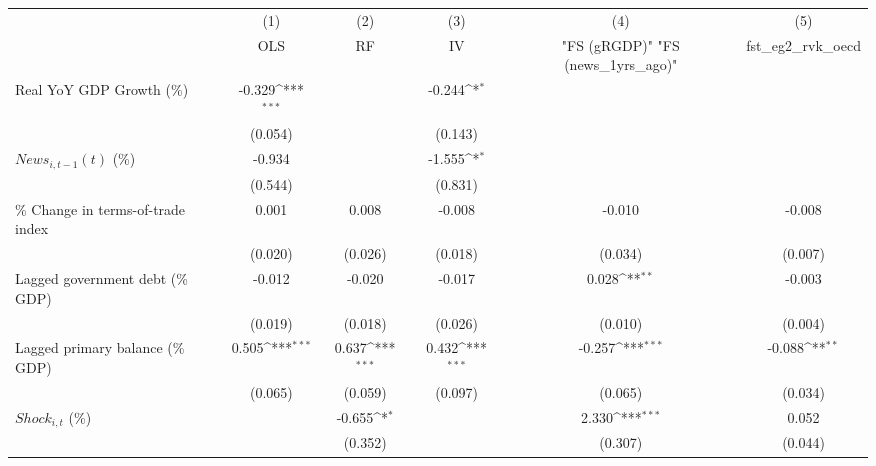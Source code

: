 {
\def\sym#1{\ifmmode^{#1}\else\(^{#1}\)\fi}
\begin{tabular}{l*{5}{c}}
\toprule
                    &\multicolumn{1}{c}{(1)}&\multicolumn{1}{c}{(2)}&\multicolumn{1}{c}{(3)}&\multicolumn{1}{c}{(4)}&\multicolumn{1}{c}{(5)}\\
                    &\multicolumn{1}{c}{OLS}&\multicolumn{1}{c}{RF}&\multicolumn{1}{c}{IV}&\multicolumn{1}{c}{ "FS (gRGDP)"  "FS (news_1yrs_ago)" }&\multicolumn{1}{c}{fst_eg2_rvk_oecd}\\
\midrule
Real YoY GDP Growth (\%)&      -0.329\sym{***}&                     &      -0.244\sym{*}  &                     &                     \\
                    &     (0.054)         &                     &     (0.143)         &                     &                     \\
\addlinespace
$ News_{i,t-1}(t)$ (\%)&      -0.934         &                     &      -1.555\sym{*}  &                     &                     \\
                    &     (0.544)         &                     &     (0.831)         &                     &                     \\
\addlinespace
\% Change in terms-of-trade index&       0.001         &       0.008         &      -0.008         &      -0.010         &      -0.008         \\
                    &     (0.020)         &     (0.026)         &     (0.018)         &     (0.034)         &     (0.007)         \\
\addlinespace
Lagged government debt (\% GDP)&      -0.012         &      -0.020         &      -0.017         &       0.028\sym{**} &      -0.003         \\
                    &     (0.019)         &     (0.018)         &     (0.026)         &     (0.010)         &     (0.004)         \\
\addlinespace
Lagged primary balance (\% GDP)&       0.505\sym{***}&       0.637\sym{***}&       0.432\sym{***}&      -0.257\sym{***}&      -0.088\sym{**} \\
                    &     (0.065)         &     (0.059)         &     (0.097)         &     (0.065)         &     (0.034)         \\
\addlinespace
$ Shock_{i,t}$ (\%) &                     &      -0.655\sym{*}  &                     &       2.330\sym{***}&       0.052         \\
                    &                     &     (0.352)         &                     &     (0.307)         &     (0.044)         \\

\end{tabular}}
